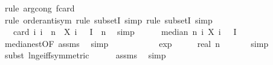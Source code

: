 \begin{isabellebody}
\ {\isacharparenleft}{\kern0pt}rule\ arg{\isacharunderscore}{\kern0pt}cong{\isacharbrackleft}{\kern0pt}\ f{\isacharequal}{\kern0pt}{\isachardoublequoteopen}card{\isachardoublequoteclose}{\isacharbrackright}{\kern0pt}{\isacharparenright}{\kern0pt}\isanewline
\ \ \ \ \ \ \isamarkupfalse%
\ {\isacharparenleft}{\kern0pt}rule\ order{\isacharunderscore}{\kern0pt}antisym{\isacharcomma}{\kern0pt}\ rule\ subsetI{\isacharcomma}{\kern0pt}\ simp{\isacharcomma}{\kern0pt}\ rule\ subsetI{\isacharcomma}{\kern0pt}\ simp{\isacharparenright}{\kern0pt}\isanewline
\ \ \ \ \isamarkupfalse%
\ \isamarkupfalse%
\ {\isachardoublequoteopen}{}\ {\isacharasterisk}{\kern0pt}\ card\ {\isacharbraceleft}{\kern0pt}i{\isachardot}{\kern0pt}\ i\ {\isacharless}{\kern0pt}\ n\ {\isasymand}\ X\ i\ {\isasymomega}\ {\isasymin}\ I{\isacharbraceright}{\kern0pt}\ {\isachargreater}{\kern0pt}\ n{\isachardoublequoteclose}\ \isamarkupfalse%
\ simp\isanewline
\ \ \ \ \isamarkupfalse%
\ {\isachardoublequoteopen}median\ n\ {\isacharparenleft}{\kern0pt}{\isasymlambda}i{\isachardot}{\kern0pt}\ X\ i\ {\isasymomega}{\isacharparenright}{\kern0pt}\ {\isasymin}\ I{\isachardoublequoteclose}\isanewline
\ \ \ \ \ \ \isamarkupfalse%
\ median{\isacharunderscore}{\kern0pt}est{\isacharbrackleft}{\kern0pt}OF\ assms{\isacharparenleft}{\kern0pt}{}{\isacharparenright}{\kern0pt}{\isacharbrackright}{\kern0pt}\ \isamarkupfalse%
\ simp\isanewline
\ \ \isamarkupfalse%
\isanewline
\isanewline
\ \ \isamarkupfalse%
\ {\isachardoublequoteopen}{}\ {\isacharminus}{\kern0pt}\ {\isasymepsilon}\ {\isasymle}\ {}{\isacharminus}{\kern0pt}\ exp\ {\isacharparenleft}{\kern0pt}{\isacharminus}{\kern0pt}\ {\isacharparenleft}{\kern0pt}{}\ {\isacharasterisk}{\kern0pt}\ {\isasymalpha}\ {\isacharasterisk}{\kern0pt}\ real\ n{\isacharparenright}{\kern0pt}{\isacharparenright}{\kern0pt}{\isachardoublequoteclose}\ \isanewline
\ \ \ \ \isamarkupfalse%
\ simp\isanewline
\ \ \ \ \isamarkupfalse%
\ {\isacharparenleft}{\kern0pt}subst\ ln{\isacharunderscore}{\kern0pt}ge{\isacharunderscore}{\kern0pt}iff{\isacharbrackleft}{\kern0pt}symmetric{\isacharbrackright}{\kern0pt}{\isacharparenright}{\kern0pt}\isanewline
\ \ \ \ \isamarkupfalse%
\ assms{\isacharparenleft}{\kern0pt}{}{\isacharparenright}{\kern0pt}\ \isamarkupfalse%
\ simp\isanewline

\end{isabellebody}
